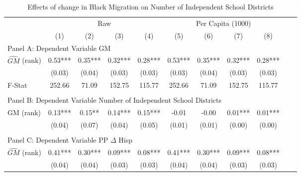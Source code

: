  \begin{table}[htbp]\centering {} \begin{threeparttable} \caption{Effects of change in Black Migration on Number of Independent School Districts} \begin{tabular}{l*{10}{c}} \toprule
                &\multicolumn{4}{c}{Raw}                                    &\multicolumn{4}{c}{Per Capita (1000)}                      \\\cmidrule(lr){2-5}\cmidrule(lr){6-9}
                &\multicolumn{1}{c}{(1)}   &\multicolumn{1}{c}{(2)}   &\multicolumn{1}{c}{(3)}   &\multicolumn{1}{c}{(4)}   &\multicolumn{1}{c}{(5)}   &\multicolumn{1}{c}{(6)}   &\multicolumn{1}{c}{(7)}   &\multicolumn{1}{c}{(8)}   \\
\cmidrule(lr){1-9}
\multicolumn{8}{l}{Panel A: Dependent Variable GM}\\
\cmidrule(lr){1-9}
$\hat{GM}$ (rank)&       0.53***&       0.35***&       0.32***&       0.28***&       0.53***&       0.35***&       0.32***&       0.28***\\
                &     (0.03)   &     (0.04)   &     (0.03)   &     (0.03)   &     (0.03)   &     (0.04)   &     (0.03)   &     (0.03)   \\
\midrule
F-Stat          &     252.66   &      71.09   &     152.75   &     115.77   &     252.66   &      71.09   &     152.75   &     115.77   \\
\cmidrule[\heavyrulewidth](lr){1-9} \\ \cmidrule[\heavyrulewidth](lr){1-9}
\multicolumn{8}{l}{Panel B: Dependent Variable Number of Independent School Districts}\\
\cmidrule(lr){1-9}
GM  (rank)      &       0.13***&       0.15** &       0.14***&       0.15***&      -0.01   &      -0.00   &       0.01***&       0.01***\\
                &     (0.04)   &     (0.07)   &     (0.04)   &     (0.05)   &     (0.01)   &     (0.01)   &     (0.00)   &     (0.00)   \\
\cmidrule[\heavyrulewidth](lr){1-9} \\ \cmidrule[\heavyrulewidth](lr){1-9}
\multicolumn{8}{l}{Panel C: Dependent Variable PP $\Delta$ Hisp}\\
\cmidrule(lr){1-9}
$\hat{GM}$ (rank)&       0.41***&       0.30***&       0.09***&       0.08***&       0.41***&       0.30***&       0.09***&       0.08***\\
                &     (0.04)   &     (0.04)   &     (0.03)   &     (0.03)   &     (0.04)   &     (0.04)   &     (0.03)   &     (0.03)   \\

\end{tabular}
\end{threeparttable}
\end{table}
